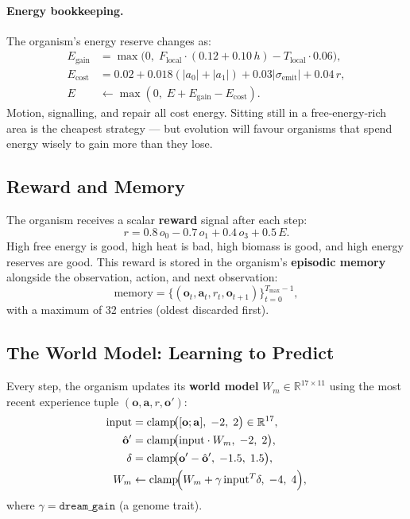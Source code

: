 \documentclass[12pt,a4paper]{article}
\newcommand{\RR}{\mathbb{R}}
\newcommand{\vv}[1]{\mathbf{#1}}
\DeclareMathOperator{\clamp}{clamp}
\begin{document}
\paragraph{Energy bookkeeping.}
The organism's energy reserve changes as:
\begin{align}
  E_\text{gain} &= \max\!\bigl(0,\;
    F_\text{local}\cdot(0.12 + 0.10\,h) - T_\text{local}\cdot 0.06\bigr), \\
  E_\text{cost} &= 0.02 + 0.018(|a_0|+|a_1|) + 0.03|\sigma_\text{emit}|
    + 0.04\,r, \\
  E &\leftarrow \max(0,\; E + E_\text{gain} - E_\text{cost}).
\end{align}
Motion, signalling, and repair all cost energy.
Sitting still in a free-energy-rich area is the cheapest strategy —
but evolution will favour organisms that spend energy wisely
to gain more than they lose.

\subsection{Reward and Memory}

The organism receives a scalar \textbf{reward} signal after each step:
\begin{equation}
  r = 0.8\,o_0 - 0.7\,o_1 + 0.4\,o_3 + 0.5\,E.
  \label{eq:reward}
\end{equation}
High free energy is good, high heat is bad, high biomass is good,
and high energy reserves are good.
This reward is stored in the organism's \textbf{episodic memory}
alongside the observation, action, and next observation:
\[
  \text{memory} = \{(\vv{o}_t, \vv{a}_t, r_t, \vv{o}_{t+1})\}_{t=0}^{T_{\max}-1},
\]
with a maximum of 32 entries (oldest discarded first).

\subsection{The World Model: Learning to Predict}

Every step, the organism updates its \textbf{world model}
$W_m \in \RR^{17\times 11}$ using
the most recent experience tuple $(\vv{o}, \vv{a}, r, \vv{o}')$:
\begin{align}
  \text{input} &= \clamp\!\bigl([\vv{o};\vv{a}],\;-2,\;2\bigr) \in \RR^{17}, \\
  \hat{\vv{o}}' &= \clamp\!\bigl(\text{input}\cdot W_m,\;-2,\;2\bigr), \\
  \delta &= \clamp\!\bigl(\vv{o}' - \hat{\vv{o}}',\;-1.5,\;1.5\bigr), \\
  W_m &\leftarrow \clamp\!\Bigl(W_m + \gamma\,\text{input}^T \delta,\;-4,\;4\Bigr),
  \label{eq:worldmodel}
\end{align}
where $\gamma = \texttt{dream\_gain}$ (a genome trait).
\end{document}
